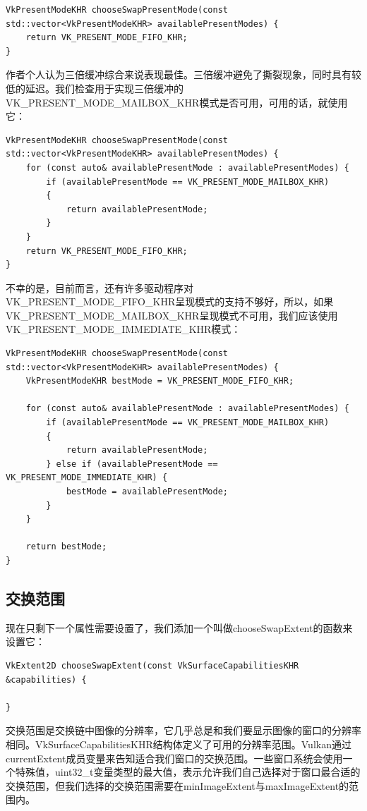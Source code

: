 \documentclass{ctexart}
\begin{document}
\begin{lstlisting}[language={[ANSI]C}]
VkPresentModeKHR chooseSwapPresentMode(const std::vector<VkPresentModeKHR> availablePresentModes) {
	return VK_PRESENT_MODE_FIFO_KHR;
}
\end{lstlisting}

作者个人认为三倍缓冲综合来说表现最佳。三倍缓冲避免了撕裂现象，同时具有较低的延迟。我们检查用于实现三倍缓冲的VK\_PRESENT\_MODE\_MAILBOX\_KHR模式是否可用，可用的话，就使用它：

\begin{lstlisting}[language={[ANSI]C}]
VkPresentModeKHR chooseSwapPresentMode(const std::vector<VkPresentModeKHR> availablePresentModes) {
	for (const auto& availablePresentMode : availablePresentModes) {
		if (availablePresentMode == VK_PRESENT_MODE_MAILBOX_KHR)
		{
			return availablePresentMode;
		}
	}
	return VK_PRESENT_MODE_FIFO_KHR;
}
\end{lstlisting}

不幸的是，目前而言，还有许多驱动程序对VK\_PRESENT\_MODE\_FIFO\_KHR呈现模式的支持不够好，所以，如果VK\_PRESENT\_MODE\_MAILBOX\_KHR呈现模式不可用，我们应该使用VK\_PRESENT\_MODE\_IMMEDIATE\_KHR模式：

\begin{lstlisting}[language={[ANSI]C}]
VkPresentModeKHR chooseSwapPresentMode(const std::vector<VkPresentModeKHR> availablePresentModes) {
	VkPresentModeKHR bestMode = VK_PRESENT_MODE_FIFO_KHR;

	for (const auto& availablePresentMode : availablePresentModes) {
		if (availablePresentMode == VK_PRESENT_MODE_MAILBOX_KHR)
		{
			return availablePresentMode;
		} else if (availablePresentMode == VK_PRESENT_MODE_IMMEDIATE_KHR) {
			bestMode = availablePresentMode;
		}
	}

	return bestMode;
}
\end{lstlisting}

\subsection{交换范围}

现在只剩下一个属性需要设置了，我们添加一个叫做chooseSwapExtent的函数来设置它：

\begin{lstlisting}[language={[ANSI]C}]
VkExtent2D chooseSwapExtent(const VkSurfaceCapabilitiesKHR &capabilities) {

}
\end{lstlisting}

交换范围是交换链中图像的分辨率，它几乎总是和我们要显示图像的窗口的分辨率相同。VkSurfaceCapabilitiesKHR结构体定义了可用的分辨率范围。Vulkan通过currentExtent成员变量来告知适合我们窗口的交换范围。一些窗口系统会使用一个特殊值，uint32\_t变量类型的最大值，表示允许我们自己选择对于窗口最合适的交换范围，但我们选择的交换范围需要在minImageExtent与maxImageExtent的范围内。
\end{document}
